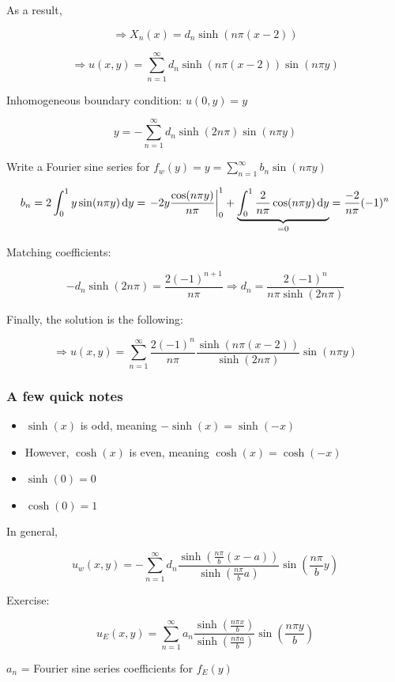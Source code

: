\documentclass{article}
\begin{document}
As a result, 

$$\Rightarrow X_n (x) = d_n \sinh \left( n \pi (x-2) \right)$$

$$\Rightarrow u(x,y) = \sum_{n=1}^\infty d_n \sinh \left( n \pi (x-2) \right) \sin (n \pi y)$$

Inhomogeneous boundary condition: $u(0,y) = y$

$$y = - \sum_{n=1}^\infty d_n \sinh \left( 2 n \pi \right) \sin (n \pi y)$$

Write a Fourier sine series for $f_w(y) = y = \sum_{n=1}^\infty b_n \sin (n \pi y)$

$$b_n = 2 \int_0^1 y \sin(n \pi y) \,\mathrm{d} y = \left. -2y \frac{\cos(n \pi y)}{n \pi} \right|_0^1 + \underbrace{\int_0^1 \frac{2}{n \pi} \cos(n \pi y) \,\mathrm{d} y}_{ = 0} = \frac{-2}{n \pi} (-1)^n$$

Matching coefficients:

$$- d_n \sinh (2 n \pi) = \frac{2 (-1)^{n+1}}{n \pi} \Rightarrow d_n = \frac{2 (-1)^n}{n \pi \sinh(2 n \pi)}$$

Finally, the solution is the following:

$$\Rightarrow u(x,y) = \sum_{n=1}^\infty \frac{2 (-1)^{n}}{n \pi} \frac{\sinh(n \pi (x-2))}{\sinh (2 n \pi)} \sin(n \pi y)$$

\subsubsection{A few quick notes}

\begin{itemize}
    \item $\sinh(x)$ is odd, meaning $- \sinh(x) = \sinh(-x)$
    \item However, $\cosh(x)$ is even, meaning $\cosh(x) = \cosh(-x)$
    \item $\sinh(0) = 0$
    \item $\cosh(0) = 1$
\end{itemize}

In general,

$$u_w(x,y) = -\sum_{n=1}^\infty d_n \frac{\sinh( \frac{n \pi}{b} (x-a))}{\sinh( \frac{n \pi}{b} a)} \sin( \frac{n \pi}{b} y)$$

Exercise:

$$u_E (x,y) = \sum_{n=1}^\infty a_n \frac{\sinh ( \frac{n \pi x}{b})}{ \sinh( \frac{n \pi a}{b})} \sin( \frac{n \pi y}{b})$$

\begin{center}
    $a_n$ = Fourier sine series coefficients for $f_E (y)$
\end{center}
\end{document}
